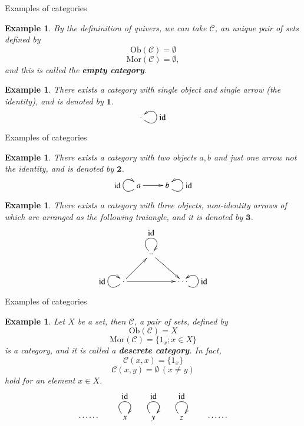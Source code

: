 \documentclass[dvipdfmx,10pt,notheorems]{beamer}
\newtheorem{example}[theorem]{Example}
\renewcommand{\#}{^\sharp}
\newcommand{\id}{\mbox{id}}
\begin{document}
	\begin{frame}{Examples of categories}
			\begin{example}
					By the defininition of quivers, we can take $\mathcal{C}$, an unique pair of sets defined by
							$$
									\mathrm{Ob}(\mathcal{C})=\emptyset
							$$
							$$
									\mathrm{Mor}(\mathcal{C})=\emptyset,
							$$
					and this is called the {\bf empty category}. \\
			\end{example}
			\begin{example}
					There exists a category with single object and single arrow (the identity), and is denoted by
					$\mathbf{1}$.
							$$
									\xymatrix{\cdot \ar@(dr,ur)_{\id}}
							$$
			\end{example}
	\end{frame}




	\begin{frame}{Examples of categories}
			\begin{example}
					There exists a category with two objects $a,b$ and just one arrow									
					not the identity, and is denoted by
					$\mathbf{2}$.
							$$
														\xymatrix{
														a
														\ar@(dl,ul)^{\id}
														\ar[r]^{}
														&
														b
														\ar@(dr,ur)_{\id}
														}
							$$
			\end{example}
			\begin{example}
					There exists a category with three objects, non-identity arrows of which are arranged as the following traiangle,
					and it is denoted by
					$\mathbf{3}$.
					$$
														\xymatrix{
														&
														\cdot \cdot
														\ar[rd]^{}
														\ar@(ul,ur)^{\id}
														&
														\\
														\cdot
														\ar[ru]^{}
														\ar[rr]^{}
														\ar@(dl,ul)^{\id}
														&
														&
														\cdot \cdot \cdot
														\ar@(dr,ur)_{\id}
														}
					$$
			\end{example}
	\end{frame}



	\begin{frame}{Examples of categories}
			\begin{example}
					Let $X$ be a set, then $\mathcal{C}$, a pair of sets, defined by
							$$\mathrm{Ob}(\mathcal{C})=X$$
							$$\mathrm{Mor}(\mathcal{C})=\{1_x;x\in X\}$$
					is a category, and it is called a {\bf descrete category}.
					In fact,
							$$\mathcal{C}(x,x)=\{1_x\}$$
							$$\mathcal{C}(x,y)=\emptyset~(x\neq y)$$
					hold for an element $x\in X$.
							$$
														\xymatrix{
														\cdots \cdots
														&
														x
														\ar@(ul,ur)^{\id}
														&
														y
														\ar@(ul,ur)^{\id}
														&
														z
														\ar@(ul,ur)^{\id}
														&
														\cdots \cdots
														}
							$$
			\end{example}
	\end{frame}
\end{document}
